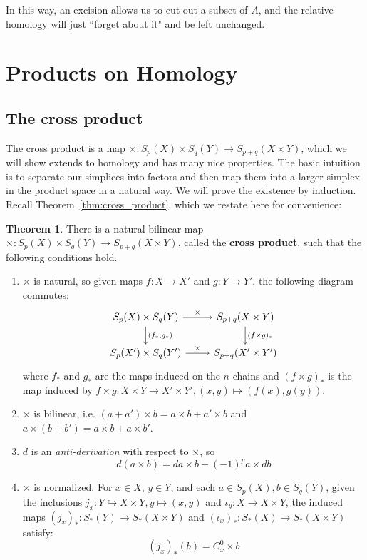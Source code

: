 \documentclass[11pt, oneside]{amsart}   	%
\theoremstyle{definition}
\newtheorem{theorem}{Theorem}[section]
\begin{document}
In this way, an excision allows us to cut out a subset of $A$, and the relative homology will just ``forget about it" and be left 
unchanged. 

\newpage
\label{subsec:products}
\section{Products on Homology}

\subsection{The cross product}

The cross product is a map $\times : S_p(X)\times S_q(Y)\rightarrow S_{p + q}(X\times Y)$, which we will show extends to 
homology and has many nice properties. The basic intuition is to separate our simplices into factors and then map them into a 
larger simplex in the product space in a natural way. We will prove the existence by induction. Recall 
Theorem~\ref{thm:cross_product}, which we restate here for convenience:

\begin{theorem}
	There is a natural bilinear map $\times : S_p(X)\times S_q(Y)\rightarrow S_{p + q}(X \times Y)$, called the \textbf{cross 
	product}, such that the following conditions hold.
	\begin{enumerate}
		\item $\times$ is natural, so given maps $f : X\rightarrow X'$ and $g : Y\rightarrow Y'$, the following diagram 
		commutes:
		\begin{equation}\begin{tikzcd}
			S_p(X)\times S_q(Y) \arrow[r, "\times"]\arrow[d, "{(f_*, g_*)}"] & S_{p + q}(X \times Y)
			\arrow[d, "(f \times g)_*"] \\
			S_p(X')\times S_q(Y')\arrow[r, "\times"] & S_{p + q}(X'\times Y')
		\end{tikzcd}\end{equation}
		where $f_*$ and $g_*$ are the maps induced on the $n$-chains and $(f\times g)_*$ is the map induced by 
		$f\times g : X\times Y\rightarrow X'\times Y', (x, y)\mapsto (f(x), g(y))$. 
		\item $\times$ is bilinear, i.e. $(a + a')\times b = a\times b + a'\times b$ and $a\times (b + b') = a\times b + a\times 
		b'$. 
		\item $d$ is an \textit{anti-derivation} with respect to $\times$, so
		\[
			d(a\times b) = da\times b + (-1)^p a\times db
		\]
		\item $\times$ is normalized. For $x\in X$, $y\in Y$, and each $a\in S_p(X), b\in S_q(Y)$, given the inclusions 
		$j_x : Y\hookrightarrow X\times Y, y\mapsto (x, y)$ and $\iota_y : X\rightarrow X\times Y$, the induced maps 
		$(j_x)_* : S_*(Y)\rightarrow S_*(X\times Y)$ and $(\iota_x)_* : S_*(X)\rightarrow S_*(X\times Y)$ satisfy:
		\[
			(j_x)_*(b) = C_x^0\times b
		\]
	\end{enumerate}
\end{theorem}
\end{document}
